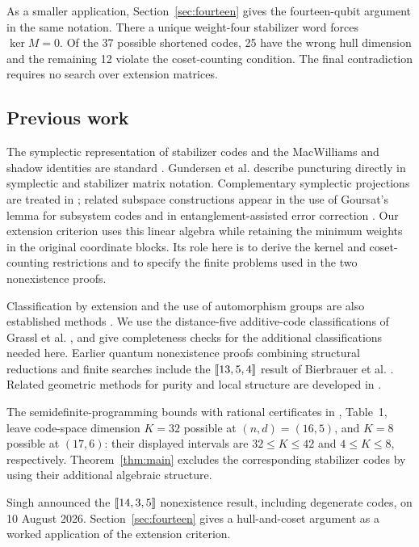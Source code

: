 As a smaller application, Section~\ref{sec:fourteen} gives the
fourteen-qubit argument in the same notation. There a unique weight-four
stabilizer word forces \(\ker M=0\). Of the 37 possible shortened
codes, 25 have the wrong hull dimension and the remaining 12 violate the
coset-counting condition. The final contradiction requires no search over
extension matrices.

\subsection{Previous work}

The symplectic representation of stabilizer codes and the MacWilliams and
shadow identities are standard \cite{crss,rains}. Gundersen et al.
\cite{puncturing} describe puncturing directly in symplectic and stabilizer
matrix notation. Complementary symplectic projections are treated in
\cite{anticodes}; related subspace constructions appear in the use of
Goursat's lemma for subsystem codes \cite{goursat} and in
entanglement-assisted error correction \cite{catalytic}.
Our extension criterion uses this linear algebra while retaining the
minimum weights in the original coordinate blocks. Its role here is to
derive the kernel and coset-counting restrictions and to specify the
finite problems used in the two nonexistence proofs.

Classification by extension and the use of automorphism groups are also
established methods \cite{kaski}. We use the distance-five additive-code
classifications of Grassl et al. \cite{dodeca}, and give completeness
checks for the additional classifications needed here. Earlier quantum
nonexistence proofs combining structural reductions and finite searches
include the \([\![13,5,4]\!]\) result of Bierbrauer et al. \cite{bierbrauer}.
Related geometric methods for purity and local structure are developed
in \cite{geometry}.

The semidefinite-programming bounds with rational certificates in \cite{sdp}, Table~1,
leave code-space dimension \(K=32\) possible at \((n,d)=(16,5)\),
and \(K=8\) possible at \((17,6)\): their displayed intervals are
\(32\leq K\leq42\) and \(4\leq K\leq8\), respectively.
Theorem~\ref{thm:main} excludes the corresponding stabilizer codes by
using their additional algebraic structure.

Singh \cite{singh} announced the \([\![14,3,5]\!]\) nonexistence result,
including degenerate codes, on 10 August 2026. Section~\ref{sec:fourteen}
gives a hull-and-coset argument as a worked application of the extension
criterion.

